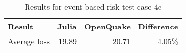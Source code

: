 \begin{table}[htbp]

\centering
\begin{tabular}{ l r r r }

\hline
\rowcolor{anti-flashwhite}
\bf{Result} & \bf{Julia} & \bf{OpenQuake} & \bf{Difference}\\
\hline
Average loss & 19.89 & 20.71 & 4.05\% \\
\hline
\end{tabular}

\caption{Results for event based risk test case 4c}
\label{tab:result-ebr-4c}
\end{table}